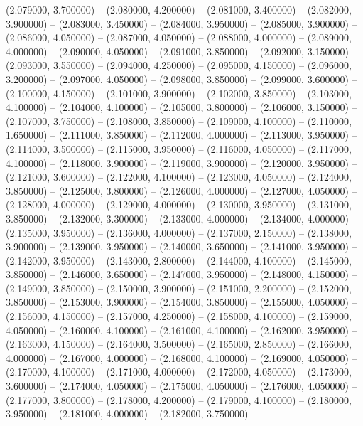 (2.079000, 3.700000) -- 
(2.080000, 4.200000) -- 
(2.081000, 3.400000) -- 
(2.082000, 3.900000) -- 
(2.083000, 3.450000) -- 
(2.084000, 3.950000) -- 
(2.085000, 3.900000) -- 
(2.086000, 4.050000) -- 
(2.087000, 4.050000) -- 
(2.088000, 4.000000) -- 
(2.089000, 4.000000) -- 
(2.090000, 4.050000) -- 
(2.091000, 3.850000) -- 
(2.092000, 3.150000) -- 
(2.093000, 3.550000) -- 
(2.094000, 4.250000) -- 
(2.095000, 4.150000) -- 
(2.096000, 3.200000) -- 
(2.097000, 4.050000) -- 
(2.098000, 3.850000) -- 
(2.099000, 3.600000) -- 
(2.100000, 4.150000) -- 
(2.101000, 3.900000) -- 
(2.102000, 3.850000) -- 
(2.103000, 4.100000) -- 
(2.104000, 4.100000) -- 
(2.105000, 3.800000) -- 
(2.106000, 3.150000) -- 
(2.107000, 3.750000) -- 
(2.108000, 3.850000) -- 
(2.109000, 4.100000) -- 
(2.110000, 1.650000) -- 
(2.111000, 3.850000) -- 
(2.112000, 4.000000) -- 
(2.113000, 3.950000) -- 
(2.114000, 3.500000) -- 
(2.115000, 3.950000) -- 
(2.116000, 4.050000) -- 
(2.117000, 4.100000) -- 
(2.118000, 3.900000) -- 
(2.119000, 3.900000) -- 
(2.120000, 3.950000) -- 
(2.121000, 3.600000) -- 
(2.122000, 4.100000) -- 
(2.123000, 4.050000) -- 
(2.124000, 3.850000) -- 
(2.125000, 3.800000) -- 
(2.126000, 4.000000) -- 
(2.127000, 4.050000) -- 
(2.128000, 4.000000) -- 
(2.129000, 4.000000) -- 
(2.130000, 3.950000) -- 
(2.131000, 3.850000) -- 
(2.132000, 3.300000) -- 
(2.133000, 4.000000) -- 
(2.134000, 4.000000) -- 
(2.135000, 3.950000) -- 
(2.136000, 4.000000) -- 
(2.137000, 2.150000) -- 
(2.138000, 3.900000) -- 
(2.139000, 3.950000) -- 
(2.140000, 3.650000) -- 
(2.141000, 3.950000) -- 
(2.142000, 3.950000) -- 
(2.143000, 2.800000) -- 
(2.144000, 4.100000) -- 
(2.145000, 3.850000) -- 
(2.146000, 3.650000) -- 
(2.147000, 3.950000) -- 
(2.148000, 4.150000) -- 
(2.149000, 3.850000) -- 
(2.150000, 3.900000) -- 
(2.151000, 2.200000) -- 
(2.152000, 3.850000) -- 
(2.153000, 3.900000) -- 
(2.154000, 3.850000) -- 
(2.155000, 4.050000) -- 
(2.156000, 4.150000) -- 
(2.157000, 4.250000) -- 
(2.158000, 4.100000) -- 
(2.159000, 4.050000) -- 
(2.160000, 4.100000) -- 
(2.161000, 4.100000) -- 
(2.162000, 3.950000) -- 
(2.163000, 4.150000) -- 
(2.164000, 3.500000) -- 
(2.165000, 2.850000) -- 
(2.166000, 4.000000) -- 
(2.167000, 4.000000) -- 
(2.168000, 4.100000) -- 
(2.169000, 4.050000) -- 
(2.170000, 4.100000) -- 
(2.171000, 4.000000) -- 
(2.172000, 4.050000) -- 
(2.173000, 3.600000) -- 
(2.174000, 4.050000) -- 
(2.175000, 4.050000) -- 
(2.176000, 4.050000) -- 
(2.177000, 3.800000) -- 
(2.178000, 4.200000) -- 
(2.179000, 4.100000) -- 
(2.180000, 3.950000) -- 
(2.181000, 4.000000) -- 
(2.182000, 3.750000) -- 
